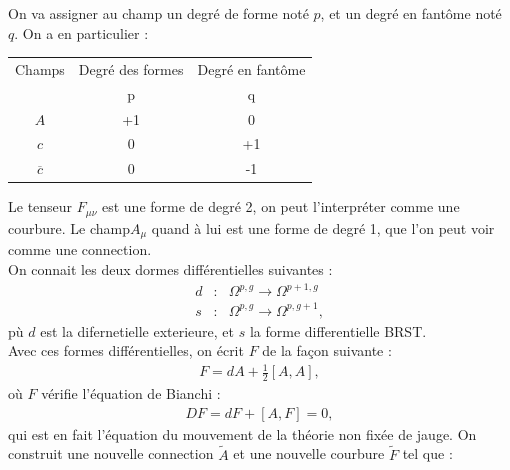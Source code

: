 \documentclass[a4paper,11pt]{article}
\theoremstyle{plain}
\theoremstyle{definition}
\theoremstyle{remark}
\numberwithin{equation}{section}
\numberwithin{equation}{subsection}
\numberwithin{figure}{section}
\begin{document}
\noindent
On va assigner au champ un degré de forme noté $p$, et un degré en fantôme noté $q$. On a en particulier :
\begin{center}
\begin{tabular}{|c|c|c|}
\hline
   Champs & Degré des formes & Degré en fantôme \\
   & p & q \\
\hline
\hline
 $A$ & +1 & 0 \\
\hline
 $c$ & 0 & +1 \\
\hline
 $\overline{c}$ & 0 & -1 \\
\hline
\end{tabular}
\end{center}
Le tenseur $F_{\mu \nu}$ est une forme de degré 2, on peut l'interpréter comme une courbure. Le champ$A_{\mu}$ quand à lui est une forme 
de degré 1, que l'on peut voir comme une connection.\\
On connait les deux dormes différentielles suivantes :
\begin{eqnarray}
 d &:& \Omega^{p,g} \rightarrow \Omega^{p+1,g}\\
 s &:& \Omega^{p,g} \rightarrow \Omega^{p,g+1} ,
\end{eqnarray}
pù $d$ est la difernetielle exterieure, et $s$ la forme differentielle BRST.\\
Avec ces formes différentielles, on écrit $F$ de la façon suivante :
\begin{eqnarray}
 F = dA + \frac{1}{2} [A,A] ,
\end{eqnarray}
où $F$ vérifie l'équation de Bianchi :
\begin{eqnarray}
 DF = dF + [A,F] = 0 ,
\end{eqnarray}
qui est en fait l'équation du mouvement de la théorie non fixée de jauge.
On construit une nouvelle connection $\tilde{A}$ et une nouvelle courbure $\tilde{F}$ tel que :
\end{document}
